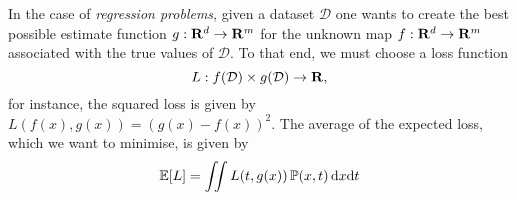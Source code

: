 In the case of \emph{regression problems}, given a dataset \(\mathcal{D}\) one
wants to create the best possible estimate function \(g: \mathbf{R}^d \to \mathbf{R}^m\) for the
unknown map \(f: \mathbf{R}^d \to \mathbf{R}^m\) associated with the true values of
\(\mathcal{D}\). To that end, we must choose a loss function
\[
    L: f(\mathcal{D}) \times g(\mathcal{D}) \to \mathbf{R},
\]
for instance, the squared loss is given by \(L(f(x), g(x)) = (g(x) -
f(x))^2\). The average of the expected loss, which we want to minimise, is given
by
\[
    \operatorname{\mathbb{E}}[L] = \iint L(t, g(x)) \operatorname{\mathbb{P}}(x, t)\, \mathrm{d} x \mathrm{d} t
\]




